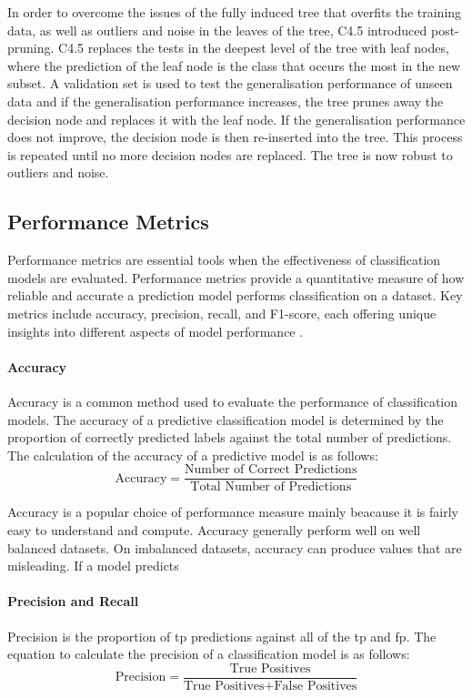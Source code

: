 \documentclass[10pt, conference]{IEEEtran}
\begin{document}
In order to overcome the issues of the fully induced tree that overfits the training data, as well as outliers and
noise in the leaves of the tree, C4.5 introduced post-pruning. C4.5 replaces the tests in the deepest level
of the tree with leaf nodes, where the prediction of the leaf node is the class that occurs the most in the new subset.
A validation set is used to test the generalisation performance of unseen data and if the generalisation performance
increases, the tree prunes away the decision node and replaces it with the leaf node. If the generalisation performance
does not improve, the decision node is then re-inserted into the tree. This process is repeated until no more decision
nodes are replaced. The tree is now robust to outliers and noise.

\subsection{Performance Metrics} \label{performance_metric_background}

Performance metrics are essential tools when the effectiveness of classification models are evaluated. Performance metrics
provide a quantitative measure of how reliable and accurate a prediction model performs classification on a dataset.
Key metrics include accuracy, precision, recall, and F1-score, each offering unique insights into different aspects
of model performance \cite{Performance_ref}.

\paragraph{Accuracy}
Accuracy is a common method used to evaluate the performance of classification models. The accuracy of
a predictive classification model is determined by the proportion of correctly predicted labels against
the total number of predictions. The calculation of the accuracy of a predictive model is as follows:
\begin{equation}
    \text{Accuracy} = \frac{\text{Number of Correct Predictions}}{\text{Total Number of Predictions}} \label{accuracy}
\end{equation}

Accuracy is a popular choice of performance measure mainly beacause it is fairly easy to understand and compute.
Accuracy generally perform well on well balanced datasets. On imbalanced datasets, accuracy can produce
values that are misleading. If a model predicts 

\paragraph{Precision and Recall}
Precision is the proportion of \acrfull{tp} predictions against all of the \acrshort{tp} and \acrfull{fp}.
The equation to calculate the precision of a classification model is as follows:
\begin{equation}
    \text{Precision} = \frac{\text{True Positives}}{\text{True Positives} + \text{False Positives}} \label{Precision}
\end{equation}
\end{document}
